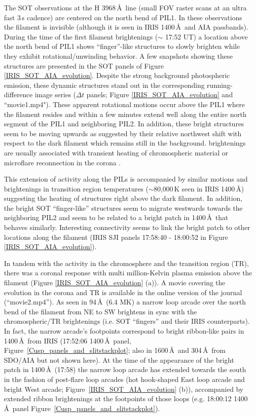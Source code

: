\documentclass[preprint]{aastex}
\begin{document}
The SOT observations at the  H 3968\,\AA\ line (small FOV raster scans at an ultra fast 3\,s cadence) are centered on the north bend of PIL1. In these observations the filament is invisible (although it is seen in IRIS 1400\,\AA\ and AIA passbands). During the time of the first filament brightenings ($\sim$ 17:52 UT) a location above the north bend of PIL1 shows ``finger''-like structures to slowly brighten while they exhibit rotational/unwinding behavior. A few snapshots showing these structures are presented in the SOT panels of Figure \ref{IRIS_SOT_AIA_evolution}. Despite the strong background photospheric emission, these dynamic structures stand out in the corresponding running-difference image series ($\Delta t$  panels; Figure \ref{IRIS_SOT_AIA_evolution} and ``movie1.mp4"). These apparent rotational motions occur above the PIL1 where the filament resides and within a few minutes extend well along the entire north segment of the PIL1 and neighboring PIL2. In addition, these bright structures seem to be moving upwards as suggested by their relative northwest shift with respect to the dark filament which remains still in the background.  brightenings are usually associated with transient heating of chromospheric material or microflare reconnection in the corona \citep{Shimizu_2011}. 

This extension of activity along the PILs is accompanied by similar motions and brightenings in transition region temperatures ($\sim$80,000\,K seen in IRIS  1400\,\AA) suggesting the heating of structures right above the dark filament. In addition, the bright SOT ``finger-like'' structures seem to migrate westwards towards the neighboring PIL2 and seem to be related to a bright patch in  1400\,\AA\ that behaves similarly. Interesting connectivity seems to link the bright patch to other locations along the filament (IRIS SJI panels 17:58:40 - 18:00:52 in Figure \ref{IRIS_SOT_AIA_evolution}). 

In tandem with the activity in the chromosphere and the transition region (TR), there was a coronal response with multi million-Kelvin plasma emission above the filament (Figure \ref{IRIS_SOT_AIA_evolution} (a)). A movie covering the evolution in the corona and TR is available in the online version of the journal (``movie2.mp4''). As seen in 94\,\AA\ (6.4 MK) a narrow loop arcade over the north bend of the filament from NE to SW brightens in sync with the chromospheric/TR brightenings (i.e. SOT ``fingers'' and their IRIS counterparts). In fact, the narrow arcade's footpoints correspond to bright ribbon-like pairs in 1400\,\AA\ from IRIS (17:52:06 1400\,\AA\ panel, Figure~\ref{Cusp_panels_and_slitstackplot}; also in 1600\,\AA\ and 304\,\AA\ from SDO/AIA but not shown here). At the time of the appearance of the bright patch in 1400\,\AA\ (17:58) the narrow loop arcade has extended towards the south in the fashion of post-flare loop arcades (hot hook-shaped East loop arcade and bright West arcade; Figure~\ref{IRIS_SOT_AIA_evolution} (b)), accompanied by extended ribbon brightenings at the footpoints of those loops (e.g. 18:00:12 1400\,\AA\ panel Figure~\ref{Cusp_panels_and_slitstackplot}).
\end{document}

